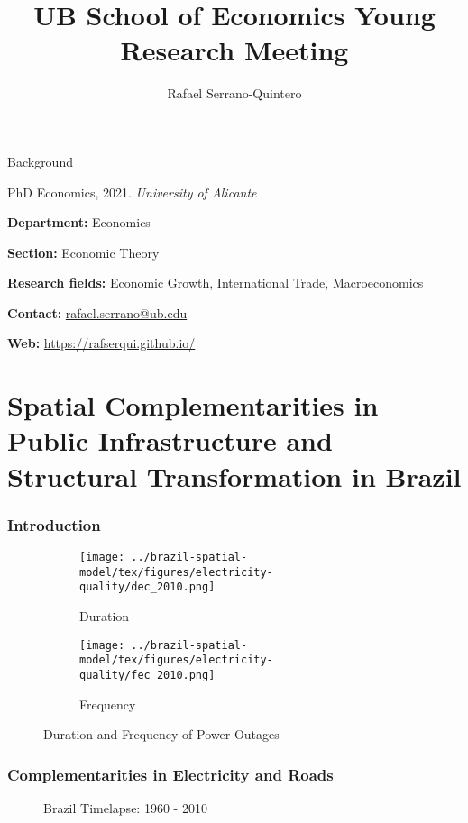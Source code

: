 \documentclass[11pt,xcolor={svgnames},aspectratio=169,usepdftitle=false]{beamer}
\title{UB School of Economics Young Research Meeting}
\author{Rafael Serrano-Quintero}
\date{}
\let\toneitemize\itemize
\let\ttwoitemize\enditemize
\renewenvironment{itemize}{\toneitemize\addtolength{\itemsep}{1.05\baselineskip}}{\ttwoitemize}
\begin{document}
\frame{\titlepage}

\begin{frame}{Background}
    \begin{itemize}
        \item PhD Economics, 2021. \textit{University of Alicante}
        \item \alert{\textbf{Department:}} Economics
        \item \alert{\textbf{Section:}} Economic Theory
        \item \alert{\textbf{Research fields:}} Economic Growth, International Trade, Macroeconomics
        \item \alert{\textbf{Contact:}} \href{mailto:rafael.serrano@ub.edu}{rafael.serrano@ub.edu}
        \item \alert{\textbf{Web:}} \href{https://rafserqui.github.io/}{https://rafserqui.github.io/}
    \end{itemize}
\end{frame}

\section{Spatial Complementarities in Public Infrastructure and Structural Transformation in Brazil}

\begin{frame}
    \frametitle{Introduction}
    \begin{figure}[htbp]
        \begin{subfigure}[b]{0.4875\linewidth}
            \centering
                \texttt{[image: ../brazil-spatial-model/tex/figures/electricity-quality/dec\_2010.png]}
                \caption{Duration}
                \label{fig:dec_2010}
        \end{subfigure}
        \begin{subfigure}[b]{0.4875\linewidth}
            \centering
                \texttt{[image: ../brazil-spatial-model/tex/figures/electricity-quality/fec\_2010.png]}
                \caption{Frequency}
                \label{fig:fec_2010}
        \end{subfigure}
        \caption{Duration and Frequency of Power Outages}
    \end{figure}
\end{frame}

\begin{frame}
    \frametitle{Complementarities in Electricity and Roads}
    \begin{figure}
        \centering
        \caption{Brazil Timelapse: 1960 - 2010}
    \end{figure}
\end{frame}
\end{document}

